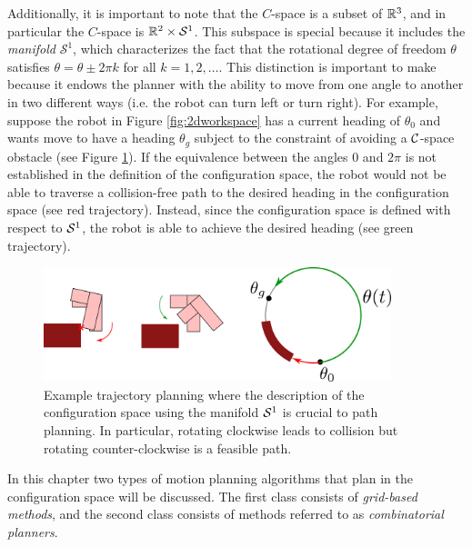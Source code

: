 \begin{example}
Additionally, it is important to note that the $C$-space is a subset of $\mathbb{R}^3$, and in particular the $C$-space is $\mathbb{R}^2 \times \mathcal{S}^1$. This subspace is special because it includes the \textit{manifold} $\mathcal{S}^1$, which characterizes the fact that the rotational degree of freedom $\theta$ satisfies $\theta = \theta \pm 2\pi k$ for all $k = 1,2,\dots$. This distinction is important to make because it endows the planner with the ability to move from one angle to another in two different ways (i.e. the robot can turn left or turn right). For example, suppose the robot in Figure \ref{fig:2dworkspace} has a current heading of $\theta_0$ and wants move to have a heading $\theta_g$ subject to the constraint of avoiding a $\mathcal{C}$-space obstacle (see Figure \ref{fig:rotational-dof-fig}). If the equivalence between the angles 0 and $2\pi$ is not established in the definition of the configuration space, the robot would not be able to traverse a collision-free path to the desired heading in the configuration space (see red trajectory). Instead, since the configuration space is defined with respect to $\mathcal{S}^1$, the robot is able to achieve the desired heading (see green trajectory).

\begin{figure}[h]
\begin{center}
\includegraphics[width=0.9\textwidth]{tex/figs/ch06_figs/S1_obstacle.png}
\caption{Example trajectory planning where the description of the configuration space using the manifold $\mathcal{S}^1$ is crucial to path planning. In particular, rotating clockwise leads to collision but rotating counter-clockwise is a feasible path.}
\label{fig:rotational-dof-fig}
\end{center}
\end{figure}

\end{example}

In this chapter two types of motion planning algorithms that plan in the configuration space will be discussed. The first class consists of \textit{grid-based methods}, and the second class consists of methods referred to as \textit{combinatorial planners}.



